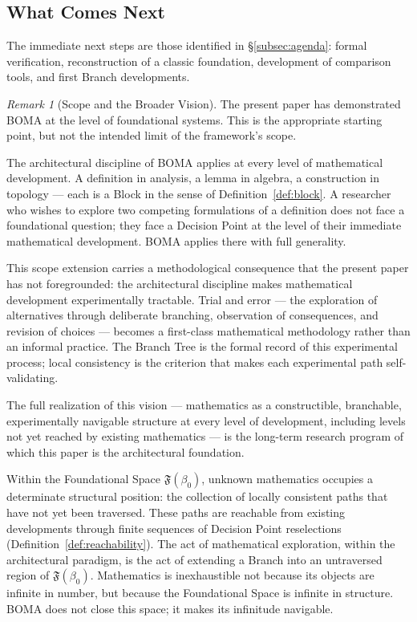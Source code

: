 \documentclass[12pt, a4paper]{article}
\theoremstyle{plain}
\theoremstyle{definition}
\theoremstyle{remark}
\newtheorem{remark}[theorem]{Remark}
\newcommand{\FS}[1]{\mathfrak{F}(#1)}
\newcommand{\BOMA}{\textsf{BOMA}}
\begin{document}
\subsection{What Comes Next}
\label{subsec:next}

The immediate next steps are those identified in
\S\ref{subsec:agenda}: formal verification, reconstruction of a
classic foundation, development of comparison tools, and first Branch
developments.

\begin{remark}[Scope and the Broader Vision]
\label{rem:scope}
The present paper has demonstrated \BOMA{} at the level of foundational
systems. This is the appropriate starting point, but not the intended
limit of the framework's scope.

The architectural discipline of \BOMA{} applies at every level of
mathematical development. A definition in analysis, a lemma in algebra,
a construction in topology --- each is a Block in the sense of
Definition~\ref{def:block}. A researcher who wishes to explore two
competing formulations of a definition does not face a foundational
question; they face a Decision Point at the level of their immediate
mathematical development. \BOMA{} applies there with full generality.

This scope extension carries a methodological consequence that the
present paper has not foregrounded: the architectural discipline makes
mathematical development experimentally tractable. Trial and error ---
the exploration of alternatives through deliberate branching,
observation of consequences, and revision of choices --- becomes a
first-class mathematical methodology rather than an informal practice.
The Branch Tree is the formal record of this experimental process;
local consistency is the criterion that makes each experimental path
self-validating.

The full realization of this vision --- mathematics as a constructible,
branchable, experimentally navigable structure at every level of
development, including levels not yet reached by existing mathematics
--- is the long-term research program of which this paper is the
architectural foundation.

Within the Foundational Space $\FS{\beta_0}$, unknown mathematics
occupies a determinate structural position: the collection of locally
consistent paths that have not yet been traversed. These paths are
reachable from existing developments through finite sequences of
Decision Point reselections (Definition~\ref{def:reachability}). The
act of mathematical exploration, within the architectural paradigm,
is the act of extending a Branch into an untraversed region of
$\FS{\beta_0}$. Mathematics is inexhaustible not because its objects
are infinite in number, but because the Foundational Space is infinite
in structure. \BOMA{} does not close this space; it makes its infinitude
navigable.
\end{remark}
\end{document}

